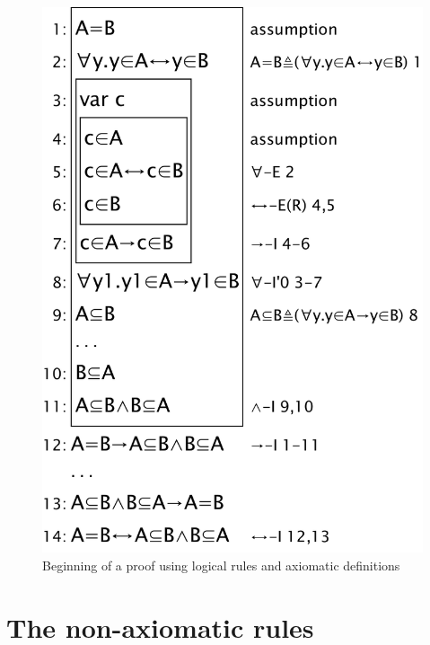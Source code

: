 \begin{figure}[htbp]
\centering
\includegraphics[scale=0.5]{pics/sets/axiomaticwasteful}
\caption{Beginning of a proof using logical rules and axiomatic definitions}
\label{fig:sets:axiomaticwasteful}
\end{figure}

\section{The non-axiomatic rules}

